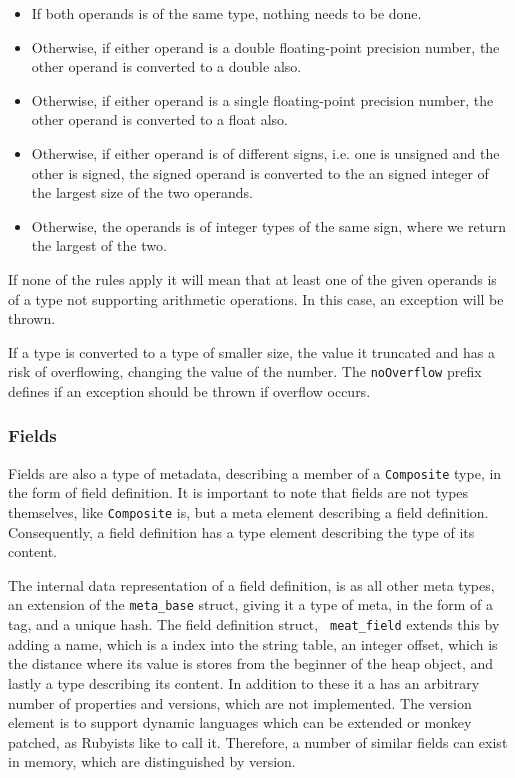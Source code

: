 \begin{itemize}
  \item If both operands is of the same type, nothing needs to be done.
  \item Otherwise, if either operand is a double floating-point precision
    number, the other operand is converted to a double also.
  \item Otherwise, if either operand is a single floating-point precision
    number, the other operand is converted to a float also.
  \item Otherwise, if either operand is of different signs, i.e. one is unsigned
    and the other is signed, the signed operand is converted to the an signed
    integer of the largest size of the two operands.
  \item Otherwise, the operands is of integer types of the same sign, where we
    return the largest of the two.
\end{itemize}

If none of the rules apply it will mean that at least one of the given operands
is of a type not supporting arithmetic operations. In this case, an exception
will be thrown.

If a type is converted to a type of smaller size, the value it truncated and has
a risk of overflowing, changing the value of the number. The {\tt noOverflow}
prefix defines if an exception should be thrown if overflow occurs.

\subsubsection{Fields}
\label{sec:implementation:meta:fields}

Fields are also a type of metadata, describing a member of a {\tt Composite}
type, in the form of field definition. It is important to note that fields are
not types themselves, like {\tt Composite} is, but a meta element describing a
field definition. Consequently, a field definition has a type element describing
the type of its content.

The internal data representation of a field definition, is as all other meta
types, an extension of the {\tt meta\_base} struct, giving it a type of meta, in
the form of a tag, and a unique hash. The field definition struct, {\tt
  meat\_field} extends this by adding a name, which is a index into the string
table, an integer offset, which is the distance where its value is stores from
the beginner of the heap object, and lastly a type describing its content. In
addition to these it a has an arbitrary number of properties and versions, which
are not implemented. The version element is to support dynamic languages
which can be extended or monkey patched, as Rubyists like to call it. Therefore,
a number of similar fields can exist in memory, which are distinguished by
version. %

